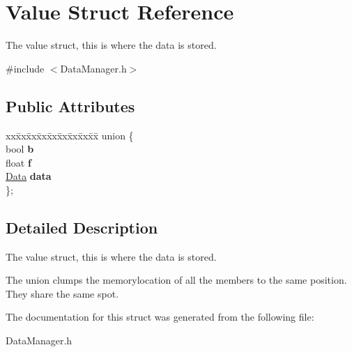 \hypertarget{struct_value}{}\section{Value Struct Reference}
\label{struct_value}


The value struct, this is where the data is stored.  




{\ttfamily \#include $<$Data\+Manager.\+h$>$}

\subsection*{Public Attributes}
\begin{DoxyCompactItemize}
\item 
\mbox{\label{struct_value_a87b14ca4230ad53b23e9ac1729616125}} 
\begin{tabbing}
xx\=xx\=xx\=xx\=xx\=xx\=xx\=xx\=xx\=\kill
union \{\\
\>bool {\bfseries b}\\
\>float {\bfseries f}\\
\>\hyperlink{struct_data}{Data} {\bfseries data}\\
\}; \\

\end{tabbing}\end{DoxyCompactItemize}


\subsection{Detailed Description}
The value struct, this is where the data is stored. 

The union clumps the memorylocation of all the members to the same position. They share the same spot. 

The documentation for this struct was generated from the following file\+:\begin{DoxyCompactItemize}
\item 
Data\+Manager.\+h\end{DoxyCompactItemize}
